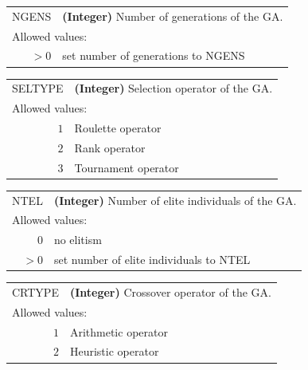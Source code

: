 \documentclass[10pt,a4paper,openany]{memoir}
\numberwithin{equation}{section}
\begin{document}
{
\begin{tabular}{r@{ : }l}
\label{descr:ngens}
     NGENS&\textbf{(Integer)} Number of generations of the GA.                                                             \\ 
\multicolumn{2}{l}{Allowed values:} \\ 
    \(>0\)&set number of generations to NGENS                                                                   \\ 
\end{tabular}
\vspace{1ex}
}

{
\begin{tabular}{r@{ : }l}
\label{descr:seltype}
   SELTYPE&\textbf{(Integer)} Selection operator of the GA.                                                                        \\ 
\multicolumn{2}{l}{Allowed values:} \\ 
     \(1\)&Roulette operator                                                                                    \\ 
     \(2\)&Rank operator                                                                                        \\ 
     \(3\)&Tournament operator                                                                                  \\ 
\end{tabular}
\vspace{1ex}
}

{
\begin{tabular}{r@{ : }l}
\label{descr:ntel}
      NTEL&\textbf{(Integer)} Number of elite individuals of the GA.                                                    \\ 
\multicolumn{2}{l}{Allowed values:} \\ 
     \(0\)&no elitism                                                                                           \\ 
    \(>0\)&set number of elite individuals to NTEL                                                              \\ 
\end{tabular}
\vspace{1ex}
}

{
\begin{tabular}{r@{ : }l}
\label{descr:crtype}
    CRTYPE&\textbf{(Integer)} Crossover operator of the GA.                                                                       \\ 
\multicolumn{2}{l}{Allowed values:} \\ 
     \(1\)&Arithmetic operator                                                                                  \\ 
     \(2\)&Heuristic operator                                                                                   \\ 
\end{tabular}
\vspace{1ex}
}
\end{document}
